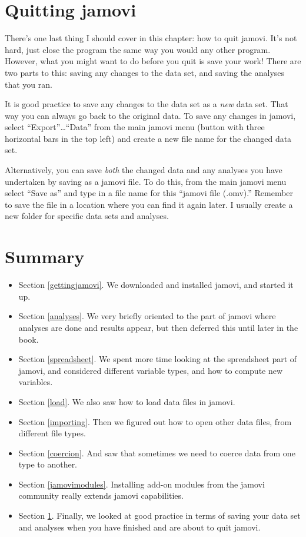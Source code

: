\documentclass[
]{book}
\providecommand{\tightlist}{%
  \setlength{\itemsep}{0pt}\setlength{\parskip}{0pt}}
\begin{document}
\hypertarget{quittingjamovi}{%
\section{Quitting jamovi}\label{quittingjamovi}}

There's one last thing I should cover in this chapter: how to quit jamovi. It's not hard, just close the program the same way you would any other program. However, what you might want to do before you quit is save your work! There are two parts to this: saving any changes to the data set, and saving the analyses that you ran.

It is good practice to save any changes to the data set as a \emph{new} data set. That way you can always go back to the original data. To save any changes in jamovi, select ``Export''\ldots{}``Data'' from the main jamovi menu (button with three horizontal bars in the top left) and create a new file name for the changed data set.

Alternatively, you can save \emph{both} the changed data and any analyses you have undertaken by saving as a jamovi file. To do this, from the main jamovi menu select ``Save as'' and type in a file name for this ``jamovi file (.omv).'' Remember to save the file in a location where you can find it again later. I usually create a new folder for specific data sets and analyses.

\hypertarget{summary-1}{%
\section{Summary}\label{summary-1}}

\begin{itemize}
\tightlist
\item
  Section \ref{gettingjamovi}. We downloaded and installed jamovi, and started it up.
\item
  Section \ref{analyses}. We very briefly oriented to the part of jamovi where analyses are done and results appear, but then deferred this until later in the book.
\item
  Section \ref{spreadsheet}. We spent more time looking at the spreadsheet part of jamovi, and considered different variable types, and how to compute new variables.
\item
  Section \ref{load}. We also saw how to load data files in jamovi.
\item
  Section \ref{importing}. Then we figured out how to open other data files, from different file types.
\item
  Section \ref{coercion}. And saw that sometimes we need to coerce data from one type to another.
\item
  Section \ref{jamovimodules}. Installing add-on modules from the jamovi community really extends jamovi capabilities.
\item
  Section \ref{quittingjamovi}. Finally, we looked at good practice in terms of saving your data set and analyses when you have finished and are about to quit jamovi.
\end{itemize}
\end{document}
